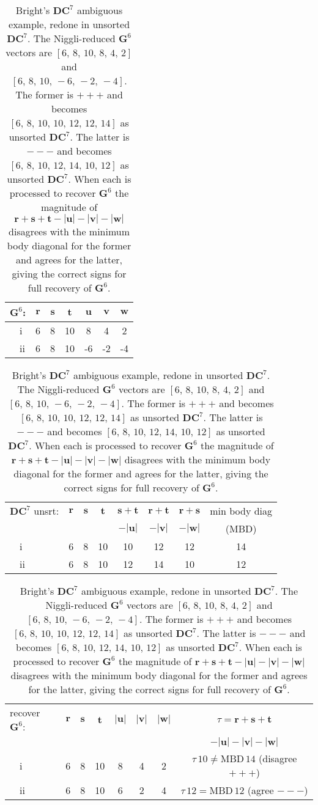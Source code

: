 \documentclass[preprint]{iucr}              %
\begin{document}
{\begin{table}
\caption{Bright's $\mathbf{DC}^7$ ambiguous example, redone in unsorted $\mathbf{DC}^7$.
The  Niggli-reduced $\mathbf{G}^6$ vectors are $ [ 6,\, 8,\, 10,\, 8,\, 4,\, 2] $ and $ [ 6,\, 8,\, 10,\, -6,\, -2,\, -4 ] $.  The former is $+++$ and 
becomes $ [ 6,\, 8,\, 10,\, 10,\, 12,\, 12,\, 14 ] $ as unsorted $\mathbf{DC}^7$.
The latter is $---$ and becomes $ [ 6,\, 8,\, 10,\, 12,\, 14,\, 10,\, 12 ] $
as unsorted $\mathbf{DC}^7$.  When each is processed to recover $\mathbf{G}^6$
the magnitude of $\mathbf{r}+\mathbf{s}+\mathbf{t}-\mathbf{|u|}-\mathbf{|v|}-\mathbf{|w|}$ disagrees with the minimum body diagonal for the former and agrees for the latter,
giving the correct signs for full recovery of $\mathbf{G}^6$.}
\label{table::recover}
\begin{center}
\begin{tabular}{|l|ccc|ccc|}
\hline
$\mathbf{G}^6$:&
$\mathbf{r}$&$\mathbf{s}$&$\mathbf{t}$&
$\mathbf{u}$&$\mathbf{v}$&$\mathbf{w}$\\
\hline
~~i&6& 8& 10& 8& 4& 2\\
~~ii&6&8&10&-6&-2&-4\\
\hline
\end{tabular}
\end{center}
\begin{center}
\begin{tabular}{|l|ccc|ccc|c|}
\hline
$\mathbf{DC}^7$ unsrt:&
$\mathbf{r}$&$\mathbf{s}$&$\mathbf{t}$&
$\mathbf{s}+\mathbf{t}$&
$\mathbf{r}+\mathbf{t}$&
$\mathbf{r}+\mathbf{s}$&
min body diag\\
&&&&$-\mathbf{|u|}$&$-\mathbf{|v|}$&$-\mathbf{|w|}$&(MBD)\\
\hline
~~i&6&8&10&10&12&12&14\\
~~ii&6&8&10&12&14&10&12\\
\hline
\end{tabular}
\end{center}
\begin{center}
\begin{tabular}{|l|ccc|ccc|c|}
\hline
recover $\mathbf{G}^6$:&
$\mathbf{r}$&$\mathbf{s}$&$\mathbf{t}$&
$\mathbf{|u|}$&$\mathbf{|v|}$&$\mathbf{|w|}$&$\tau=\mathbf{r}+\mathbf{s}+\mathbf{t}$\\
&&&&&&&$-\mathbf{|u|}-\mathbf{|v|}-\mathbf{|w|}$\\
\hline
~~i&6&8&10&8&4&2&$\tau\, 10 \neq \text{MBD}\, 14$ (disagree $+++$)\\
~~ii&6&8&10&6&2&4&$\tau\, 12 = \text{MBD}\, 12$ (agree $---$)\\
\hline
\end{tabular}
\end{center}
\end{table}

}
\end{document}
